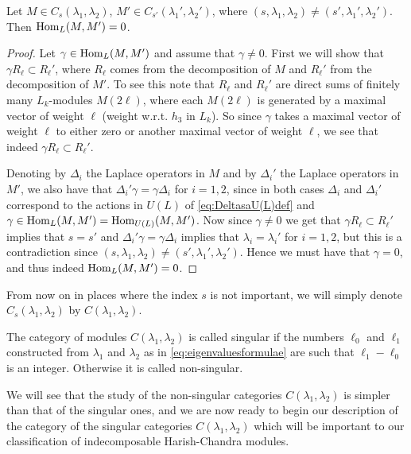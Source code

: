 \begin{proposition}
  Let $M\in C_s(\lambda_1,\lambda_2)$, $M'\in C_{s'}(\lambda_1',\lambda_2')$, where $(s,\lambda_1,\lambda_2)\neq (s',\lambda_1',\lambda_2')$. Then $\operatorname{Hom}_L(M,M')=0$.
\end{proposition}
\begin{proof}
  Let $\gamma\in\operatorname{Hom}_L(M,M')$ and assume that $\gamma\neq 0$. First we will show that $\gamma R_\ell \subset R_\ell'$, where $R_\ell$ comes from the decomposition of $M$ and $R_\ell'$ from the decomposition of $M'$. To see this note that $R_\ell$ and $R_\ell'$ are direct sums of finitely many $L_k$-modules $M(2\ell)$, where each $M(2\ell)$ is generated by a maximal vector of weight $\ell$ (weight w.r.t. $h_3$ in $L_k$). So since $\gamma$ takes a maximal vector of weight $\ell$ to either zero or another maximal vector of weight $\ell$, we see that indeed $\gamma R_\ell \subset R_\ell'$.
  
  Denoting by $\Delta_i$ the Laplace operators in $M$ and by $\Delta_i'$ the Laplace operators in $M'$, we also have that $\Delta_i' \gamma = \gamma \Delta_i$ for $i=1,2$, since in both cases $\Delta_i$ and $\Delta_i'$ correspond to the actions in $U(L)$ of \cref{eq:DeltasaU(L)def} and $\gamma\in\operatorname{Hom}_L(M,M')=\operatorname{Hom}_{U(L)}(M,M')$. Now since $\gamma\neq 0$ we get that $\gamma R_\ell \subset R_\ell'$ implies that $s=s'$ and $\Delta_i'\gamma=\gamma\Delta_i$ implies that $\lambda_i=\lambda_i'$ for $i=1,2$, but this is a contradiction since $(s,\lambda_1,\lambda_2)\neq (s',\lambda_1',\lambda_2')$. Hence we must have that $\gamma=0$, and thus indeed $\operatorname{Hom}_L(M,M')=0$. 
\end{proof}

\begin{remark}
  From now on in places where the index $s$ is not important, we will simply denote $C_s(\lambda_1,\lambda_2)$ by $C(\lambda_1,\lambda_2)$. 
\end{remark}

\begin{definition}
  The category of modules $C(\lambda_1,\lambda_2)$ is called singular if the numbers $\ell_0$ and $\ell_1$ constructed from $\lambda_1$ and $\lambda_2$ as in \cref{eq:eigenvaluesformulae} are such that $\ell_1-\ell_0$ is an integer. Otherwise it is called non-singular.
\end{definition}

We will see that the study of the non-singular categories $C(\lambda_1,\lambda_2)$ is simpler than that of the singular ones, and we are now ready to begin our description of the category of the singular categories $C(\lambda_1,\lambda_2)$ which will be important to our classification of indecomposable Harish-Chandra modules. 

